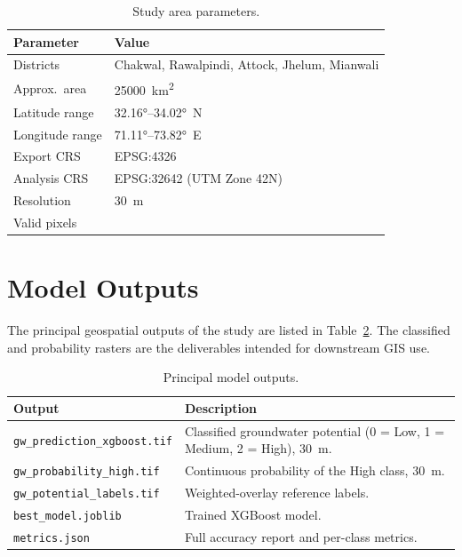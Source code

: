 \begin{table}[H]
\centering
\caption{Study area parameters.}
\label{tab:area_spec}
\begin{tabular}{ll}
\toprule
Parameter & Value \\
\midrule
Districts & Chakwal, Rawalpindi, Attock, Jhelum, Mianwali \\
Approx.\ area & \SI{25000}{\kilo\meter\squared} \\
Latitude range & \ang{32.16}--\ang{34.02}~N \\
Longitude range & \ang{71.11}--\ang{73.82}~E \\
Export CRS & EPSG:4326 \\
Analysis CRS & EPSG:32642 (UTM Zone 42N) \\
Resolution & 30~m \\
Valid pixels & \npixels{} \\
\bottomrule
\end{tabular}
\end{table}

\section{Model Outputs}
\label{app:outputs}

The principal geospatial outputs of the study are listed in
Table~\ref{tab:outputs}. The classified and probability rasters are the
deliverables intended for downstream GIS use.

\begin{table}[H]
\centering
\caption{Principal model outputs.}
\label{tab:outputs}
\small
\begin{tabular}{p{5.2cm} p{8cm}}
\toprule
Output & Description \\
\midrule
\texttt{gw\_prediction\_xgboost.tif} & Classified groundwater potential (0 = Low, 1 = Medium, 2 = High), 30~m. \\
\texttt{gw\_probability\_high.tif}   & Continuous probability of the High class, 30~m. \\
\texttt{gw\_potential\_labels.tif}   & Weighted-overlay reference labels. \\
\texttt{best\_model.joblib}          & Trained XGBoost model. \\
\texttt{metrics.json}                & Full accuracy report and per-class metrics. \\
\bottomrule
\end{tabular}
\end{table}

